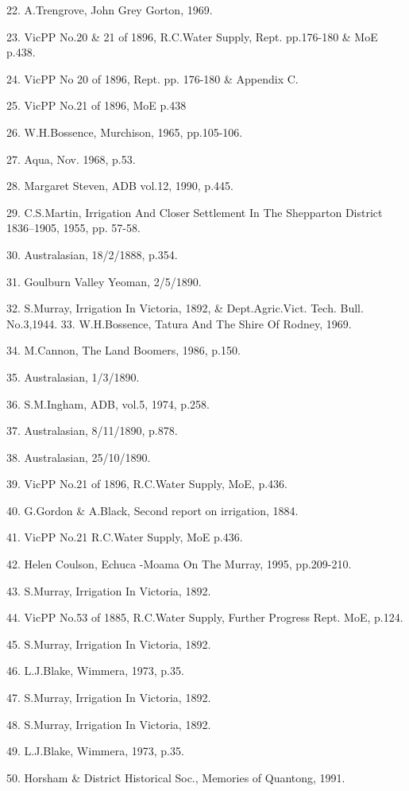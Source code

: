 22. A.Trengrove, John Grey Gorton, 1969.

23. VicPP No.20 \& 21 of 1896, R.C.Water Supply, Rept.  pp.176-180 \& 
      MoE p.438.

24. VicPP No 20 of 1896, Rept.  pp. 176-180 \& Appendix C.

25. VicPP No.21 of 1896, MoE p.438

26. W.H.Bossence, Murchison, 1965, pp.105-106.

27. Aqua, Nov. 1968, p.53.

28. Margaret Steven, ADB vol.12, 1990, p.445.

29. C.S.Martin, Irrigation And Closer Settlement In The Shepparton
    District 1836--1905, 1955, pp. 57-58.

30. Australasian, 18/2/1888, p.354.

31. Goulburn Valley Yeoman, 2/5/1890.

32. S.Murray, Irrigation In Victoria, 1892, \& Dept.Agric.Vict. Tech. Bull. No.3,1944.  33. W.H.Bossence, Tatura And The Shire Of Rodney, 1969.

34. M.Cannon, The Land Boomers, 1986, p.150.

35. Australasian, 1/3/1890.

36. S.M.Ingham, ADB, vol.5, 1974, p.258.

37. Australasian, 8/11/1890, p.878.

38. Australasian, 25/10/1890.

39. VicPP No.21 of 1896, R.C.Water Supply, MoE, p.436.

40. G.Gordon \& A.Black, Second report on irrigation, 1884.

41. VicPP No.21 R.C.Water Supply, MoE p.436.

42. Helen Coulson, Echuca -Moama On The Murray, 1995, pp.209-210.

43. S.Murray, Irrigation In Victoria, 1892.

44. VicPP No.53 of 1885, R.C.Water Supply, Further Progress Rept.
      MoE, p.124.

45. S.Murray, Irrigation In Victoria, 1892.

46. L.J.Blake, Wimmera, 1973, p.35.

47. S.Murray, Irrigation In Victoria, 1892.

48. S.Murray, Irrigation In Victoria, 1892.

49. L.J.Blake, Wimmera, 1973, p.35.

50. Horsham \& District Historical Soc., Memories of Quantong, 1991.

